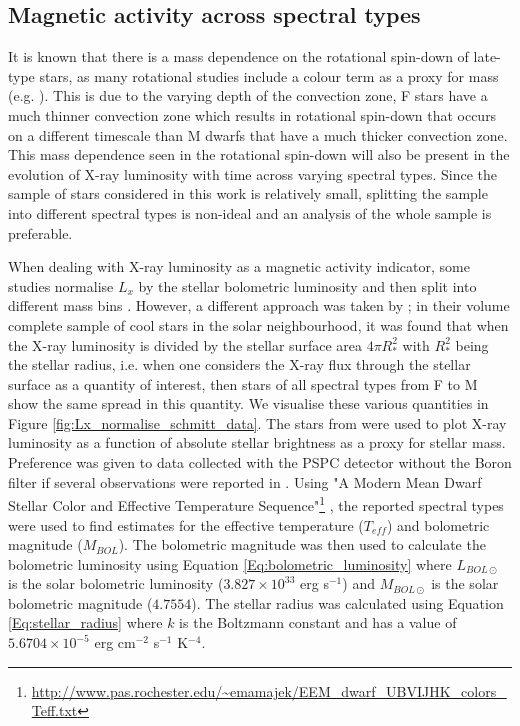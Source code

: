 \subsection{Magnetic activity across spectral types}
It is known that there is a mass dependence on the rotational spin-down of late-type stars, as many rotational studies include a colour term as a proxy for mass (e.g. \citealt{Barnes_2003,Barnes_2010,Angus_etal_2015}). This is due to the varying depth of the convection zone, F stars have a much thinner convection zone which results in rotational spin-down that occurs on a different timescale than M dwarfs that have a much thicker convection zone. This mass dependence seen in the rotational spin-down will also be present in the evolution of X-ray luminosity with time across varying spectral types. Since the sample of stars considered in this work is relatively small, splitting the sample into different spectral types is non-ideal and an analysis of the whole sample is preferable.

When dealing with X-ray luminosity as a magnetic activity indicator, some studies normalise $L_{x}$ by the stellar bolometric luminosity and then split into different mass bins \citep{Preibisch_Feigelson_2005,Jackson_etal_2012}. However, a different approach was taken by \citet{Schmitt_Liefke_2004}; in their volume complete sample of cool stars in the solar neighbourhood, it was found that when the X-ray luminosity is divided by the stellar surface area $4\pi R_{*}^{2}$ with $R_{*}^{2}$ being the stellar radius, i.e. when one considers the X-ray flux through the stellar surface as a quantity of interest, then stars of all spectral types from F to M show the same spread in this quantity. We visualise these various quantities in Figure \ref{fig:Lx_normalise_schmitt_data}. The stars from \citet{Schmitt_Liefke_2004} were used to plot X-ray luminosity as a function of absolute stellar brightness as a proxy for stellar mass. Preference was given to data collected with the PSPC detector without the Boron filter if several observations were reported in \citet{Schmitt_Liefke_2004}. Using "A Modern Mean Dwarf Stellar Color and Effective Temperature Sequence"\footnote{\url{http://www.pas.rochester.edu/~emamajek/EEM_dwarf_UBVIJHK_colors_Teff.txt}} \citep{Pecaut_Mamajek_2013}, the reported spectral types \citep{Schmitt_Liefke_2004} were used to find estimates for the effective temperature ($T_{eff}$) and bolometric magnitude ($M_{BOL}$). The bolometric magnitude was then used to calculate the bolometric luminosity using Equation \ref{Eq:bolometric_luminosity} where $L_{BOL\odot}$ is the solar bolometric luminosity ($3.827 \times 10^{33}$ erg s$^{-1}$) and $M_{BOL\odot}$ is the solar bolometric magnitude ($4.7554$). The stellar radius was calculated using Equation \ref{Eq:stellar_radius} where $k$ is the Boltzmann constant and has a value of $5.6704 \times 10^{-5}$ erg cm$^{-2}$ s$^{-1}$ K$^{-4}$. 

